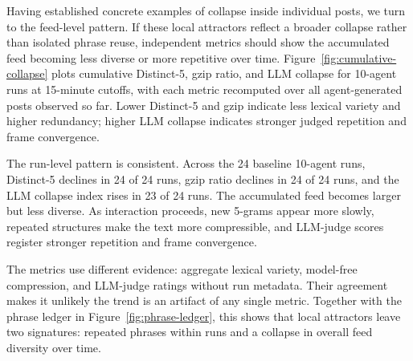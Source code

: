 \documentclass[11pt]{article}
\begin{document}
Having established concrete examples of collapse inside individual posts, we turn to the feed-level pattern. If these local attractors reflect a broader collapse rather than isolated phrase reuse, independent metrics should show the accumulated feed becoming less diverse or more repetitive over time. Figure~\ref{fig:cumulative-collapse} plots cumulative Distinct-5, gzip ratio, and LLM collapse for 10-agent runs at 15-minute cutoffs, with each metric recomputed over all agent-generated posts observed so far. Lower Distinct-5 and gzip indicate less lexical variety and higher redundancy; higher LLM collapse indicates stronger judged repetition and frame convergence.



The run-level pattern is consistent. Across the 24 baseline 10-agent runs, Distinct-5 declines in 24 of 24 runs, gzip ratio declines in 24 of 24 runs, and the LLM collapse index rises in 23 of 24 runs. The accumulated feed becomes larger but less diverse. As interaction proceeds, new 5-grams appear more slowly, repeated structures make the text more compressible, and LLM-judge scores register stronger repetition and frame convergence.

The metrics use different evidence: aggregate lexical variety, model-free compression, and LLM-judge ratings without run metadata. Their agreement makes it unlikely the trend is an artifact of any single metric. Together with the phrase ledger in Figure~\ref{fig:phrase-ledger}, this shows that local attractors leave two signatures: repeated phrases within runs and a collapse in overall feed diversity over time.
\end{document}

